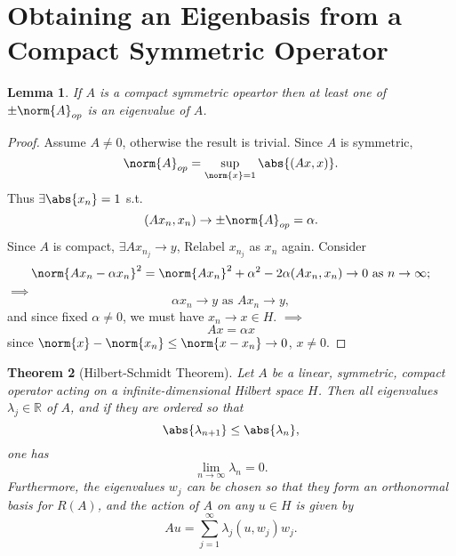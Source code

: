 \documentclass[a4paper]{book}
\newtheorem{thm}{Theorem}[chapter]
\newtheorem{lemma}[thm]{Lemma}
\DeclarePairedDelimiter{\norm}\lVert\rVert
\DeclarePairedDelimiter{\abs}\lvert\rvert
\def\R{\mathbb{R}}
\begin{document}
\section{Obtaining an Eigenbasis from a Compact Symmetric Operator}
\begin{lemma}\label{hilbert-schmidt_thms_lemma}
    If $A$ is a compact symmetric opeartor then at least one of $\pm \norm{A}_{op}$ is an eigenvalue of $A$.
\end{lemma}
\begin{proof}
    Assume $A \neq 0$, otherwise the result is trivial. Since $A$ is symmetric,
    \[\norm{A}_{op}=\sup_{\norm{x}=1}\abs{(Ax,x)}.\]
    Thus $\exists \abs{x_n}=1$ s.t.
    \[(Ax_n,x_n) \to \pm \norm{A}_{op} = \alpha.\]
    Since $A$ is compact, $\exists Ax_{n_j} \to y$, Relabel $x_{n_j}$ as $x_n$ again. Consider
    \[\norm{Ax_n-\alpha x_n}^2 = \norm{Ax_n}^2 + \alpha^2 -2\alpha(Ax_n,x_n) \to 0 \text{ as } n \to \infty;\]
    $\implies$
    \[\alpha x_n \to y \text{ as } Ax_n \to y,\]
    and since fixed $\alpha \neq 0$, we must have $x_n \to x \in H$. $\implies$
    \[Ax=\alpha x\]
    since $\norm{x}-\norm{x_n} \leq \norm{x-x_n} \to 0$, $x \neq 0$.
\end{proof}
\begin{thm}[Hilbert-Schmidt Theorem]\label{hilbert_schmidt_thm}
    Let $A$ be a linear, symmetric, compact operator acting on a infinite-dimensional Hilbert space $H$. Then all eigenvalues $\lambda_j \in \R$ of $A$, and if they are ordered so that
    \[\abs{\lambda_{n+1}} \leq \abs{\lambda_{n}},\]
    one has
    \[\lim_{n \to \infty}\lambda_n = 0.\]
    Furthermore, the eigenvalues $w_j$ can be chosen so that they form an orthonormal basis for $R(A)$, and the action of $A$ on any $u \in H$ is given by
    \[Au = \sum_{j=1}^{\infty} \lambda_j (u,w_j)w_j.\]
\end{thm}
\end{document}

